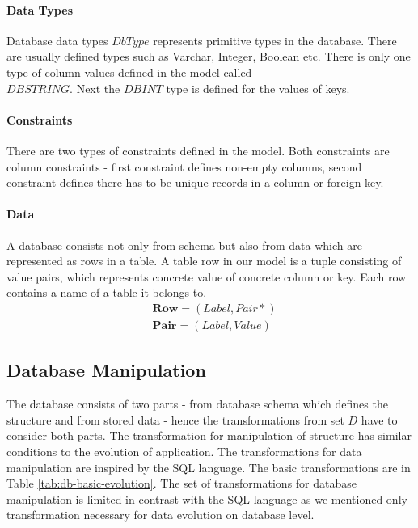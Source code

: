 \documentclass[runningheads]{comsis}
\begin{document}
\paragraph{Data Types} Database data types $DbType$ represents primitive types in the database. There are usually defined types such as Varchar, Integer, Boolean etc. There is only one type of column values defined in the model called \\ $DBSTRING$. Next the $DBINT$ type is defined for the values of keys.

\paragraph{Constraints} There are two types of constraints defined in the model. Both constraints are column constraints - first constraint defines non-empty columns, second constraint defines there has to be unique records in a column or foreign key.

\paragraph{Data} A database consists not only from schema but also from data which are represented as rows in a table. A table row in our model is a tuple consisting of value pairs, which represents concrete value of concrete column or key. Each row contains a name of a table it belongs to.
\begin{align}
&	\mathbf{Row} = (Label, Pair*) \\
&	\mathbf{Pair} = (Label, Value) 
\end{align}


\subsection{Database Manipulation}
\label{sec:db-evolution}
The database consists of two parts - from database schema which defines the structure and from stored data - hence the transformations from set $D$ have to consider both parts. The transformation for manipulation of structure has similar conditions to the evolution of application. The transformations for data manipulation are inspired by the SQL language. The basic transformations are in Table \ref{tab:db-basic-evolution}. The set of transformations for database manipulation is limited in contrast with the SQL language as we mentioned only transformation necessary for data evolution on database level. 
\end{document}
